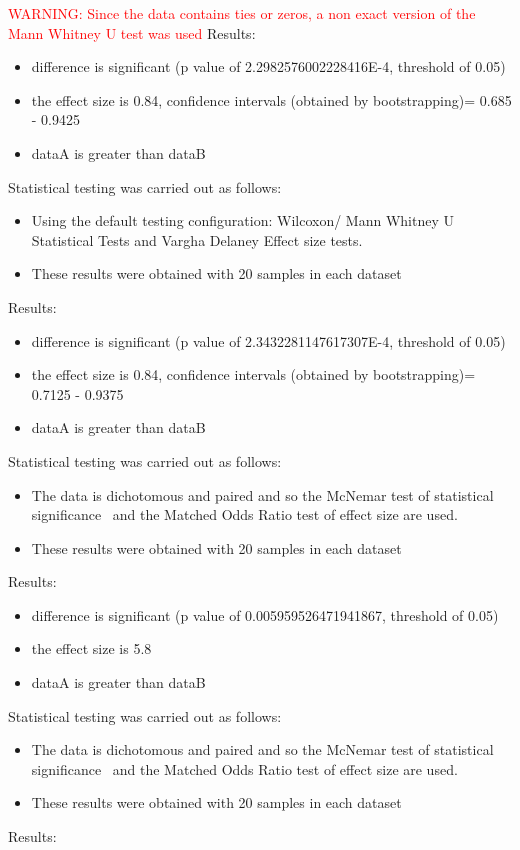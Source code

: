 \documentclass[]{article}
\begin{document}
\textcolor{Red}{WARNING: Since the data contains ties or zeros, a non exact version of the Mann Whitney U test was used
}
Results:
\begin{itemize}
\item{difference is significant (p value of 2.2982576002228416E-4, threshold of 0.05)}
\item{the effect size is 0.84, confidence intervals (obtained by bootstrapping)= 0.685 - 0.9425}
\item{dataA is greater than dataB}
\end{itemize}Statistical testing was carried out as follows: \begin{itemize}
\item{Using the default testing configuration: Wilcoxon/ Mann Whitney U Statistical Tests and Vargha Delaney Effect size tests.}
\item{These results were obtained with 20 samples in each dataset}
\end{itemize}Results:
\begin{itemize}
\item{difference is significant (p value of 2.3432281147617307E-4, threshold of 0.05)}
\item{the effect size is 0.84, confidence intervals (obtained by bootstrapping)= 0.7125 - 0.9375}
\item{dataA is greater than dataB}
\end{itemize}Statistical testing was carried out as follows: \begin{itemize}
\item{The data is dichotomous and paired and so the McNemar test of statistical significance~\cite{Gibbons2011} and the Matched Odds Ratio test of effect size are used.}
\item{These results were obtained with 20 samples in each dataset}
\end{itemize}Results:
\begin{itemize}
\item{difference is significant (p value of 0.005959526471941867, threshold of 0.05)}
\item{the effect size is 5.8}
\item{dataA is greater than dataB}
\end{itemize}Statistical testing was carried out as follows: \begin{itemize}
\item{The data is dichotomous and paired and so the McNemar test of statistical significance~\cite{Gibbons2011} and the Matched Odds Ratio test of effect size are used.}
\item{These results were obtained with 20 samples in each dataset}
\end{itemize}Results:
\end{document}
